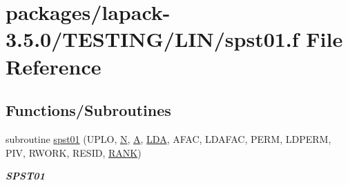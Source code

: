 \hypertarget{spst01_8f}{}\section{packages/lapack-\/3.5.0/\+T\+E\+S\+T\+I\+N\+G/\+L\+I\+N/spst01.f File Reference}
\label{spst01_8f}
\subsection*{Functions/\+Subroutines}
\begin{DoxyCompactItemize}
\item 
subroutine \hyperlink{group__single__lin_gadd6293407c7472b5988ae889e331cd08}{spst01} (U\+P\+L\+O, \hyperlink{polmisc_8c_a0240ac851181b84ac374872dc5434ee4}{N}, \hyperlink{classA}{A}, \hyperlink{example__user_8c_ae946da542ce0db94dced19b2ecefd1aa}{L\+D\+A}, A\+F\+A\+C, L\+D\+A\+F\+A\+C, P\+E\+R\+M, L\+D\+P\+E\+R\+M, P\+I\+V, R\+W\+O\+R\+K, R\+E\+S\+I\+D, \hyperlink{splinemodule_8c_a3a88bcc63386de30443dacede2e01847}{R\+A\+N\+K})
\begin{DoxyCompactList}\small\item\em {\bfseries S\+P\+S\+T01} \end{DoxyCompactList}\end{DoxyCompactItemize}
